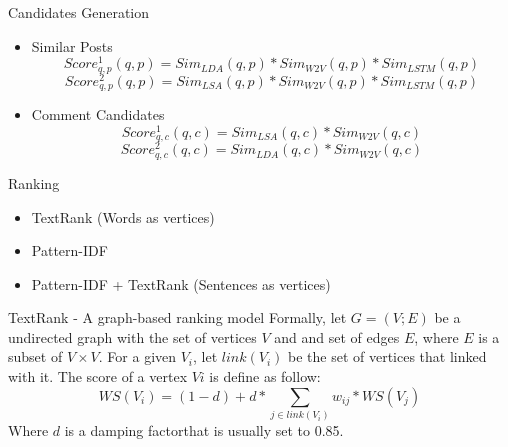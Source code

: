 \documentclass[aspectratio=169]{beamer}
\begin{document}
    \begin{frame}{Candidates Generation}
      \begin{itemize}
      \item Similar Posts
      \begin{equation}
         Score_{q,p}^1(q, p) = Sim_{LDA}(q, p) * Sim_{W2V}(q, p) * Sim_{LSTM}(q, p)
      \end{equation}
      \begin{equation}
         Score_{q,p}^2(q, p) = Sim_{LSA}(q, p) * Sim_{W2V}(q, p) * Sim_{LSTM}(q, p)
      \end{equation}
      \item Comment Candidates
      \begin{equation}
         Score_{q,c}^1(q, c) = Sim_{LSA}(q, c) * Sim_{W2V}(q, c)
      \end{equation}
      \begin{equation}
         Score_{q,c}^2(q, c) = Sim_{LDA}(q, c) * Sim_{W2V}(q, c)
      \end{equation}
    \end{itemize}
    \end{frame}

    \begin{frame}{Ranking}
      \begin{itemize}
        \item TextRank (Words as vertices)
        \item Pattern-IDF
        \item Pattern-IDF + TextRank (Sentences as vertices)
      \end{itemize}
    \end{frame}

    \begin{frame}{TextRank - A graph-based ranking model}
      Formally, let $G = (V; E)$ be a undirected graph with the set of vertices 
      $V$ and and set of edges $E$, where $E$ is a subset of $V \times V$. For 
      a given $V_i$, let $link(V_i)$ be the set of vertices that linked with 
      it. The score of a vertex $Vi$ is define as follow:
      \begin{equation}
        WS(V_i) = (1 - d) + d * \sum_{j \in link(V_i)}{w_{ij} * WS({V_j})}
      \end{equation}
      Where $d$ is a damping factor\footnotemark that is usually set to 0.85.

    \end{frame}
\end{document}
